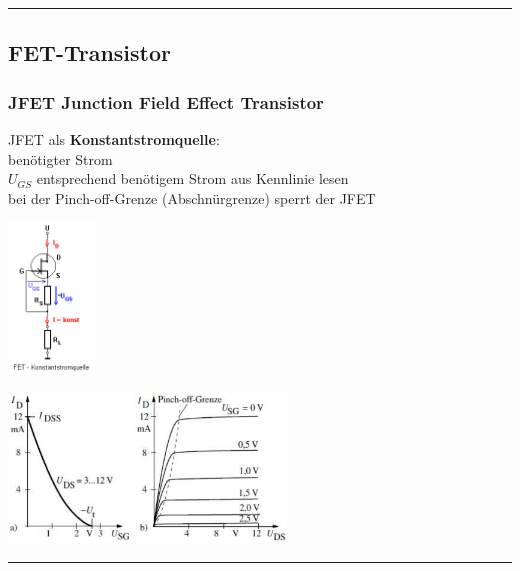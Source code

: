 \vspace{2mm}\hrule

\subsection{FET-Transistor}
  \subsubsection{JFET Junction Field Effect Transistor}
    \begin{minipage}[T]{8cm}
      JFET als {\bf Konstantstromquelle}:\\
      ben\"otigter Strom \\
      $U_{GS}$ entsprechend ben\"otigem Strom aus Kennlinie lesen\\
      bei der Pinch-off-Grenze (Abschn\"urgrenze) sperrt der JFET
    \end{minipage}
    \begin{minipage}[T]{3.4cm}
      \includegraphics[height=4cm]{./bilder/JFETCCQuelle.png}
    \end{minipage}
    \begin{minipage}[T]{6cm}
      \includegraphics[height=4cm]{./bilder/JFETKennlinie.png}
    \end{minipage}
    
\hrule

